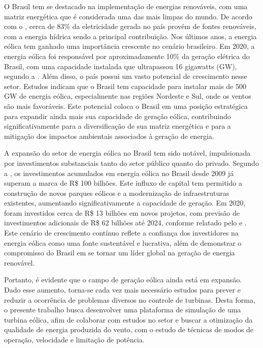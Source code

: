 \par O Brasil tem se destacado na implementação de energias renováveis, com uma matriz energética que é considerada uma das mais limpas do mundo. De acordo com o , cerca de 83\% da eletricidade gerada no país provém de fontes renováveis, com a energia hídrica sendo a principal contribuição. Nos últimos anos, a energia eólica tem ganhado uma importância crescente no cenário brasileiro. Em 2020, a energia eólica foi responsável por aproximadamente 10\% da geração elétrica do Brasil, com uma capacidade instalada que ultrapassou 16 gigawatts (GW), segundo a . Além disso, o país possui um vasto potencial de crescimento nesse setor. Estudos indicam que o Brasil tem capacidade para instalar mais de 500 GW de energia eólica, especialmente nas regiões Nordeste e Sul, onde os ventos são mais favoráveis. Este potencial coloca o Brasil em uma posição estratégica para expandir ainda mais sua capacidade de geração eólica, contribuindo significativamente para a diversificação de sua matriz energética e para a mitigação dos impactos ambientais associados à geração de energia.

\par A expansão do setor de energia eólica no Brasil tem sido notável, impulsionada por investimentos substanciais tanto do setor público quanto do privado. Segundo a , os investimentos acumulados em energia eólica no Brasil desde 2009 já superam a marca de R\$ 100 bilhões. Este influxo de capital tem permitido a construção de novos parques eólicos e a modernização de infraestruturas existentes, aumentando significativamente a capacidade de geração. Em 2020, foram investidos cerca de R\$ 13 bilhões em novos projetos, com previsão de investimentos adicionais de R\$ 62 bilhões até 2024, conforme relatado pelo  e . Este cenário de crescimento contínuo reflete a confiança dos investidores na energia eólica como uma fonte sustentável e lucrativa, além de demonstrar o compromisso do Brasil em se tornar um líder global na geração de energia renovável.
\par Portanto, é evidente que o campo de geração eólica ainda está em expansão. 
Dado esse aumento, torna-se cada vez mais necessário  estudos para prever e reduzir a  ocorrência de problemas diversos no controle de turbinas. Desta forma, o presente trabalho busca desenvolver uma plataforma de simulação de uma turbina eólica, afim de colaborar com estudos no setor e buscar a otimização da qualidade de energia produzida do vento, com o estudo de técnicas de modos de operação, velocidade e limitação de potência.




